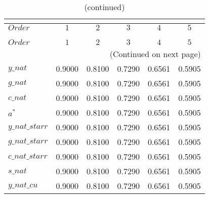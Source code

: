  
\begin{center}
\begin{longtable}{lccccc} 
\caption{COEFFICIENTS OF AUTOCORRELATION}\\
 \label{Table:th_autocorr_matrix}\\
\toprule 
$Order          $	 & 	 $         1$	 & 	 $         2$	 & 	 $         3$	 & 	 $         4$	 & 	 $         5$\\
\midrule \endfirsthead 
\caption{(continued)}\\
 \toprule \\ 
$Order          $	 & 	 $         1$	 & 	 $         2$	 & 	 $         3$	 & 	 $         4$	 & 	 $         5$\\
\midrule \endhead 
\midrule \multicolumn{6}{r}{(Continued on next page)} \\ \bottomrule \endfoot 
\bottomrule \endlastfoot 
$y\_nat         $	 & 	    0.9000	 & 	    0.8100	 & 	    0.7290	 & 	    0.6561	 & 	    0.5905 \\ 
$g\_nat         $	 & 	    0.9000	 & 	    0.8100	 & 	    0.7290	 & 	    0.6561	 & 	    0.5905 \\ 
$c\_nat         $	 & 	    0.9000	 & 	    0.8100	 & 	    0.7290	 & 	    0.6561	 & 	    0.5905 \\ 
${a^*}          $	 & 	    0.9000	 & 	    0.8100	 & 	    0.7290	 & 	    0.6561	 & 	    0.5905 \\ 
$y\_nat\_starr  $	 & 	    0.9000	 & 	    0.8100	 & 	    0.7290	 & 	    0.6561	 & 	    0.5905 \\ 
$g\_nat\_starr  $	 & 	    0.9000	 & 	    0.8100	 & 	    0.7290	 & 	    0.6561	 & 	    0.5905 \\ 
$c\_nat\_starr  $	 & 	    0.9000	 & 	    0.8100	 & 	    0.7290	 & 	    0.6561	 & 	    0.5905 \\ 
$s\_nat         $	 & 	    0.9000	 & 	    0.8100	 & 	    0.7290	 & 	    0.6561	 & 	    0.5905 \\ 
$y\_nat\_cu     $	 & 	    0.9000	 & 	    0.8100	 & 	    0.7290	 & 	    0.6561	 & 	    0.5905 \\ 
\end{longtable}
 \end{center}
